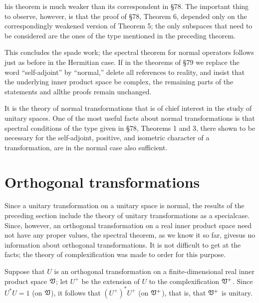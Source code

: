his theorem is much weaker than its correspondent in §78. The important thing
to observe, however, is that the proof of §78, Theorem 6, depended only on the
correspondingly weakened version of Theorem 5; the only subspaces that need to
be considered are the ones of the type mentioned in the preceding theorem.

This concludes the spade work; the spectral theorem for normal operators follows
just as before in the Hermitian case. If in the theorems of §79 we replace the
word ``self-adjoint'' by ``normal,'' delete all references to reality, and insist
that the underlying inner product space be complex, the remaining parts of the
statements and allthe proofs remain unchanged.

It is the theory of normal transformations that is of chief interest in the
study of unitary spaces. One of the most useful facts about normal
transformations is that spectral conditions of the type given in §78, Theorems 1
and 3, there shown to be necessary for the self-adjoint, positive, and isometric
character of a transformation, are in the normal case also sufficient.

\section{Orthogonal transformations}

Since a unitary transformation on a unitary space is normal, the results of the
preceding section include the theory of unitary transformations as a
specialcase. Since, however, an orthogonal transformation on a real inner
product space need not have any proper values, the spectral theorem, as we know
it so far, givesus no information about orthogonal transformations. It is not
difficult to get at the facts; the theory of complexification was made to order
for this purpose.

Suppose that \(U\) is an orthogonal transformation on a finite-dimensional real
inner product space \(\mathfrak{V}\); let \(U^+\) be the extension of \(U\) to the
complexification \(\mathfrak{V}^+\). Since \(U^* U = 1\) (on \(\mathfrak{V}\)), it follows
that \((U^+)^* U^+\) (on \(\mathfrak{V}^+\)), that is, that \(\mathfrak{V}^+\) is unitary.

